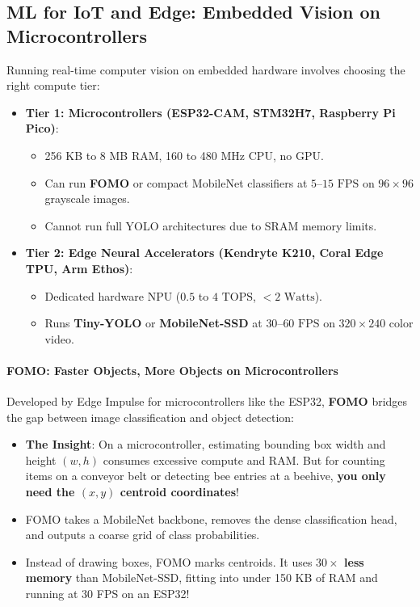 \subsection{ML for IoT and Edge: Embedded Vision on Microcontrollers}\label{subsec:iot_vision}

\begin{iotbox}
Running real-time computer vision on embedded hardware involves choosing the right compute tier:
\begin{itemize}
    \item \textbf{Tier 1: Microcontrollers (ESP32-CAM, STM32H7, Raspberry Pi Pico)}:
    \begin{itemize}
        \item 256 KB to 8 MB RAM, 160 to 480 MHz CPU, no GPU.
        \item Can run \textbf{FOMO} or compact MobileNet classifiers at $5\text{--}15\text{ FPS}$ on $96 \times 96$ grayscale images.
        \item Cannot run full YOLO architectures due to SRAM memory limits.
    \end{itemize}
    \item \textbf{Tier 2: Edge Neural Accelerators (Kendryte K210, Coral Edge TPU, Arm Ethos)}:
    \begin{itemize}
        \item Dedicated hardware NPU ($0.5$ to $4\text{ TOPS}$, $<2\text{ Watts}$).
        \item Runs \textbf{Tiny-YOLO} or \textbf{MobileNet-SSD} at $30\text{--}60\text{ FPS}$ on $320 \times 240$ color video.
    \end{itemize}
\end{itemize}
\end{iotbox}

\paragraph{FOMO: Faster Objects, More Objects on Microcontrollers}
Developed by Edge Impulse for microcontrollers like the ESP32, \textbf{FOMO} bridges the gap between image classification and object detection:
\begin{itemize}
    \item \textbf{The Insight}: On a microcontroller, estimating bounding box width and height $(w, h)$ consumes excessive compute and RAM. But for counting items on a conveyor belt or detecting bee entries at a beehive, \textbf{you only need the $(x, y)$ centroid coordinates}!
    \item FOMO takes a MobileNet backbone, removes the dense classification head, and outputs a coarse grid of class probabilities.
    \item Instead of drawing boxes, FOMO marks centroids. It uses \textbf{$30\times$ less memory} than MobileNet-SSD, fitting into under 150 KB of RAM and running at 30 FPS on an ESP32!
\end{itemize}


